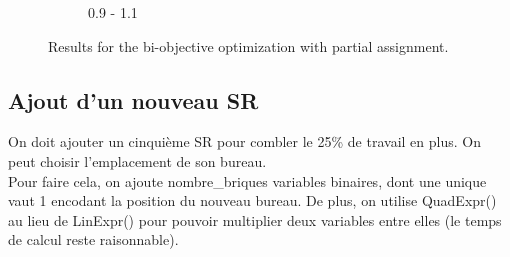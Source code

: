 \documentclass[12pt,a4paper]{article}
\begin{document}
\begin{figure}[H]
\begin{subfigure}{0.32\textwidth}
        \caption{0.9 - 1.1}
        \label{fig:solve3}
    \end{subfigure}
    \caption{Results for the bi-objective optimization with partial assignment.}
    \label{fig:all_solves}
\end{figure}

\subsection*{Ajout d'un nouveau SR}

On doit ajouter un cinquième SR pour combler le 25\% de travail en plus. On peut choisir l'emplacement de son bureau.\\
Pour faire cela, on ajoute nombre\_briques variables binaires, dont une unique vaut 1 encodant la position du nouveau bureau. De plus, on utilise QuadExpr() au lieu de LinExpr() pour pouvoir multiplier deux variables entre elles (le temps de calcul reste raisonnable).
\end{document}
